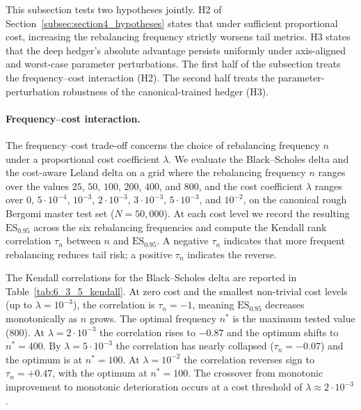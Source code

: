 \documentclass[12pt,a4paper]{article}
\theoremstyle{definition}
\theoremstyle{plain}
\theoremstyle{remark}
\theoremstyle{plain}
\begin{document}
This subsection tests two hypotheses jointly. H2 of
Section~\ref{subsec:section4_hypotheses} states that under sufficient
proportional cost, increasing the rebalancing frequency strictly
worsens tail metrics. H3 states that the deep hedger's absolute
advantage persists uniformly under axis-aligned and worst-case
parameter perturbations. The first half of the subsection treats
the frequency--cost interaction (H2). The second half treats the
parameter-perturbation robustness of the canonical-trained hedger
(H3).

\paragraph{Frequency--cost interaction.}

The frequency--cost trade-off concerns the choice of rebalancing
frequency $n$ under a proportional cost coefficient $\lambda$. We
evaluate the Black--Scholes delta and the cost-aware Leland delta on a
grid where the rebalancing frequency $n$ ranges over the values
$25$, $50$, $100$, $200$, $400$, and $800$, and the cost coefficient
$\lambda$ ranges over
$0$, $5 \cdot 10^{-4}$, $10^{-3}$, $2 \cdot 10^{-3}$,
$3 \cdot 10^{-3}$, $5 \cdot 10^{-3}$, and $10^{-2}$, on the canonical
rough Bergomi master test set ($N = 50{,}000$). At each cost level we
record the resulting $\mathrm{ES}_{0.95}$ across the six rebalancing
frequencies and compute the Kendall rank correlation $\tau_n$ between
$n$ and $\mathrm{ES}_{0.95}$. A negative $\tau_n$ indicates that more
frequent rebalancing reduces tail risk; a positive $\tau_n$ indicates
the reverse.

The Kendall correlations for the Black--Scholes delta are reported in
Table~\ref{tab:6_3_5_kendall}. At zero cost and the smallest
non-trivial cost levels (up to $\lambda = 10^{-3}$), the correlation is
$\tau_n = -1$, meaning $\mathrm{ES}_{0.95}$ decreases monotonically as
$n$ grows. The optimal frequency $n^*$ is the maximum tested value
($800$). At $\lambda = 2{\cdot}10^{-3}$ the correlation rises to
$-0.87$ and the optimum shifts to $n^* = 400$. By $\lambda = 5{\cdot}10^{-3}$
the correlation has nearly collapsed ($\tau_n = -0.07$) and the
optimum is at $n^* = 100$. At $\lambda = 10^{-2}$ the correlation
reverses sign to $\tau_n = +0.47$, with the optimum at $n^* = 100$.
The crossover from monotonic improvement to monotonic deterioration
occurs at a cost threshold of $\lambda \approx 2{\cdot}10^{-3}$.
\end{document}
